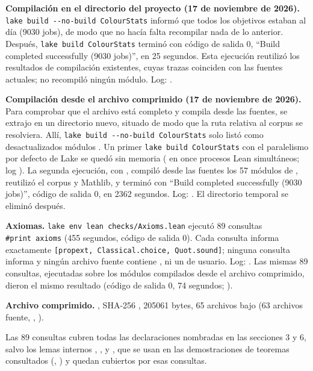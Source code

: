 \documentclass[spanish,11pt,a4paper]{article}
\begin{document}
\textbf{Compilación en el directorio del proyecto (17 de noviembre de 2026).} \texttt{lake\ build\ -\/-no-build\ ColourStats} informó que todos los objetivos estaban al día (9030 jobs), de modo que no hacía falta recompilar nada de lo anterior. Después, \texttt{lake\ build\ ColourStats} terminó con código de salida 0, ``Build completed successfully (9030 jobs)'', en 25 segundos. Esta ejecución reutilizó los resultados de compilación existentes, cuyas trazas coinciden con las fuentes actuales; no recompiló ningún módulo. Log: .

\textbf{Compilación desde el archivo comprimido (17 de noviembre de 2026).} Para comprobar que el archivo está completo y compila desde las fuentes,  se extrajo en un directorio nuevo, situado de modo que la ruta relativa al corpus se resolviera. Allí, \texttt{lake\ build\ -\/-no-build\ ColourStats} solo listó como desactualizados módulos . Un primer \texttt{lake\ build\ ColourStats} con el paralelismo por defecto de Lake se quedó sin memoria ( en once procesos Lean simultáneos; log ). La segunda ejecución, con , compiló desde las fuentes los 57 módulos de , reutilizó el corpus y Mathlib, y terminó con ``Build completed successfully (9030 jobs)'', código de salida 0, en 2362 segundos. Log: . El directorio temporal se eliminó después.

\textbf{Axiomas.} \texttt{lake\ env\ lean\ checks/Axioms.lean} ejecutó 89 consultas \texttt{\#print\ axioms} (455 segundos, código de salida 0). Cada consulta informa exactamente \texttt{{[}propext,\ Classical.choice,\ Quot.sound{]}}; ninguna consulta informa  y ningún archivo fuente contiene ,  ni un  de usuario. Log: . Las mismas 89 consultas, ejecutadas sobre los módulos compilados desde el archivo comprimido, dieron el mismo resultado (código de salida 0, 74 segundos; ).

\textbf{Archivo comprimido.} , SHA-256 , 205061 bytes, 65 archivos bajo  (63 archivos fuente, , ).

Las 89 consultas cubren todas las declaraciones nombradas en las secciones 3 y 6, salvo los lemas internos , ,  y , que se usan en las demostraciones de teoremas consultados (, ) y quedan cubiertos por esas consultas.
\end{document}
